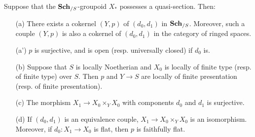\begin{lemma}\label{scheme groupoid quasi-section lemma}
Suppose that the $\mathbf{Sch}_{/S}$-groupoid $X_*$ possesses a quasi-section. Then:
\begin{enumerate}
    \item[(a)] There exists a cokernel $(Y,p)$ of $(d_0,d_1)$ in $\mathbf{Sch}_{/S}$. Moreover, such a couple $(Y,p)$ is also a cokernel of $(d_0,d_1)$ in the category of ringed spaces.
    \item[(a')] $p$ is surjective, and is open (resp. universally closed) if $d_0$ is.
    \item[(b)] Suppose that $S$ is locally Noetherian and $X_0$ is locally of finite type (resp. of finite type) over $S$. Then $p$ and $Y\to S$ are locally of finite presentation (resp. of finite presentation).
    \item[(c)] The morphism $X_1\to X_0\times_YX_0$ with components $d_0$ and $d_1$ is surjective.
    \item[(d)] If $(d_0,d_1)$ is an equivalence couple, $X_1\to X_0\times_YX_0$ is an isomorphism. Moreover, if $d_0:X_1\to X_0$ is flat, then $p$ is faithfully flat.   
\end{enumerate}
\end{lemma}
